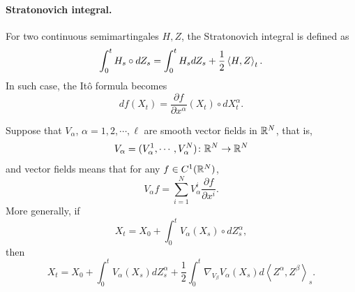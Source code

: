 \paragraph{Stratonovich integral.} For two continuous semimartingales $H,Z$, the Stratonovich integral is defined as
\begin{equation*}
	\int_0^t H_s \circ dZ_s = \int_0^tH_sdZ_s + \frac{1}{2}\left\langle H,Z \right\rangle_t.
\end{equation*}
In such case, the It\^o formula becomes
\begin{equation*}
	df(X_t) = \frac{\partial f}{\partial x^\alpha}(X_t) \circ dX^\alpha_t.
\end{equation*}

Suppose that $V_{\alpha}$, $\alpha = 1,2,\cdots, \ell$ are smooth vector fields in $\mathbb{R}^N$, that is,
\begin{equation*}
	V_{\alpha} = (V_{\alpha}^1,\cdots,V_{\alpha}^N) \colon \mathbb{R}^N \rightarrow \mathbb{R}^N
\end{equation*}
and vector fields means that for any $f \in C^1(\mathbb{R}^N)$,
\begin{equation*}
	V_{\alpha}f = \sum_{i=1}^N V_{\alpha}^i\frac{\partial f}{\partial x^i}.
\end{equation*}
More generally, if
\begin{equation*}
	X_t=X_0+\int_0^t V_\alpha\left(X_s\right) \circ d Z^\alpha_s,
\end{equation*}
then
\begin{equation*}
	X_t=X_0+\int_0^t V_\alpha\left(X_s\right) d Z_s^\alpha+\frac{1}{2} \int_0^t \nabla_{V_\beta} V_\alpha\left(X_s\right) d\left\langle Z^\alpha, Z^\beta\right\rangle_s.
\end{equation*}
